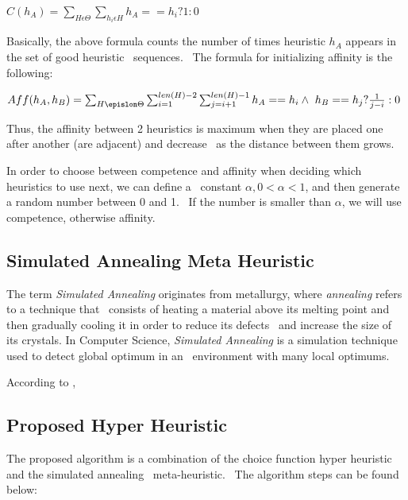 \( C(h_A) = \sum_{H \epsilon \Theta} \sum_{h_i \epsilon H} h_A == h_i ? 1 : 0 \)

Basically, the above formula counts the number of times heuristic $h_A$ appears in the set of good heuristic \
sequences. \
The formula for initializing affinity is the following:

\(  Aff(h_A, h_B) = \sum_{H \epislon \Theta} \sum_{i=1}^{len(H) - 2} \sum_{j=i+1}^{len(H) - 1} h_A == h_i \wedge \
h_B == h_j ? \frac{1}{j - i} : 0 \) %

Thus, the affinity between 2 heuristics is maximum when they are placed one after another (are adjacent) and decrease \
as the distance between them grows.

In order to choose between competence and affinity when deciding which heuristics to use next, we can define a \
constant $\alpha,  0 < \alpha < 1$, and then generate a random number between 0 and 1. \
If the number is smaller than $\alpha$, we will use competence, otherwise affinity. %


\subsection{Simulated Annealing Meta Heuristic}
\label{subsec:analysis-simulated-annealing}
The term \textit{Simulated Annealing} originates from metallurgy, where \textit{annealing} refers to a technique that \
consists of heating a material above its melting point and then gradually cooling it in order to reduce its defects \
and increase the size of its crystals.
In Computer Science, \textit{Simulated Annealing} is a simulation technique used to detect global optimum in an \
environment with many local optimums.

According to \cite{springer1}, \ %


\subsection{Proposed Hyper Heuristic}
\label{subsec:analysis-proposed-hh}
The proposed algorithm is a combination of the choice function hyper heuristic and the simulated annealing \
meta-heuristic. \
The algorithm steps can be found below: %


